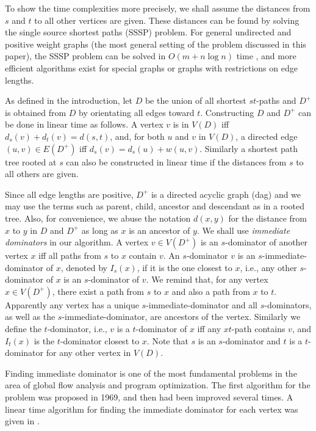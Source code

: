 To show the time complexities more precisely, we shall assume the distances from $s$ and $t$ to all other vertices are given.
These distances can be found by solving the single source shortest paths (SSSP) problem. For general undirected and positive weight graphs (the most general setting of the problem discussed in this paper), the SSSP problem can be solved in $O(m+n\log n)$ time \cite{cor01,dijk}, and more efficient algorithms exist for special graphs or graphs with restrictions on edge lengths.
 
As defined in the introduction, let $D$ be the union of all shortest $st$-paths and $D^+$ is obtained from $D$ by orientating all edges toward $t$. Constructing $D$ and $D^+$ can be done in linear time as follows. A vertex $v$ is in $V(D)$ iff $d_s(v)+d_t(v)=d(s,t)$, and, for both $u$ and $v$ in $V(D)$, a directed edge $(u,v)\in E(D^+)$ iff $d_s(v)=d_s(u)+w(u,v)$. Similarly a shortest path tree rooted at $s$ can also be constructed in linear time if the distances from $s$ to all others are given.

Since all edge lengths are positive, $D^+$ is a directed acyclic graph (dag) and we may use the terms such as parent, child, ancestor and descendant as in a rooted tree. Also, for convenience, we abuse the notation $d(x,y)$ for the distance from $x$ to $y$ in $D$ and $D^+$  as long as $x$ is an ancestor of $y$.   
We shall use \emph{immediate dominators} in our algorithm. 
A vertex $v\in V(D^+)$ is an $s$-dominator of another vertex $x$ iff all paths from $s$ to $x$ contain $v$. 
An $s$-dominator $v$ is an $s$-immediate-dominator of $x$, denoted by $I_s(x)$, if it is the one closest to $x$, i.e., any other $s$-dominator of $x$ is an $s$-dominator of $v$.
We remind that, for any vertex $x\in V(D^+)$, there exist a path from $s$ to $x$ and also a path from $x$ to $t$.
Apparently any vertex has a unique $s$-immediate-dominator and all $s$-dominators, as well as the $s$-immediate-dominator, are ancestors of the vertex.
Similarly we define the $t$-dominator, i.e., $v$ is a $t$-dominator of $x$ iff any $xt$-path contains $v$, and $I_t(x)$ is the $t$-dominator closest to $x$.
Note that $s$ is an $s$-dominator and $t$ is a $t$-dominator for any other vertex in $V(D)$.  

Finding immediate dominator is one of the most fundamental problems in the area of global flow analysis and 
program optimization. The first algorithm for the problem was proposed in 1969, and then had
been improved several times. A linear time algorithm for finding the immediate dominator for each vertex was given in \cite{als99}. 

